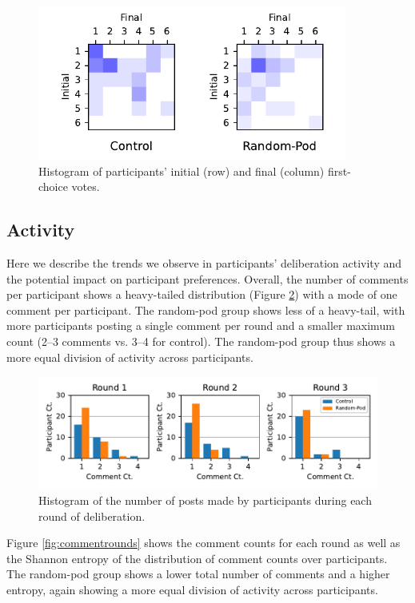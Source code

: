{\begin{figure}
    \centering
    \includegraphics[width=4in]{chapters/figures/NetDelibExp/fig-count-matrix.pdf}
    \caption{Histogram of participants' initial (row) and final (column) first-choice votes.}
    \label{fig:countmatrix}
\end{figure}


\subsection{Activity}
\label{sec:res-activity}

Here we describe the trends we observe in participants' deliberation activity and the potential impact on participant preferences.
Overall, the number of comments per participant shows a heavy-tailed distribution (Figure \ref{fig:commentcounts}) with a mode of one comment per participant.
The random-pod group shows less of a heavy-tail, with more participants posting a single comment per round and a smaller maximum count (2--3 comments vs. 3--4 for control).
The random-pod group thus shows a more equal division of activity across participants.

\begin{figure}
    \centering
    \includegraphics[width=6in]{chapters/figures/NetDelibExp/fig-comment-counts.pdf}
    \caption{Histogram of the number of posts made by participants during each round of deliberation.}
    \label{fig:commentcounts}
\end{figure}

Figure \ref{fig:commentrounds} shows the comment counts for each round as well as the Shannon entropy of the distribution of comment counts over participants.
The random-pod group shows a lower total number of comments and a higher entropy, again showing a more equal division of activity across participants.

}
